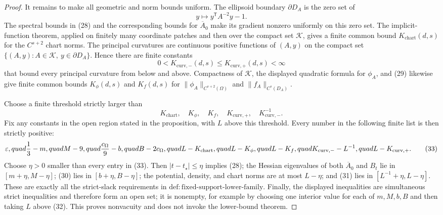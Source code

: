 \documentclass{article}
\begin{document}
\begin{proof}
It remains to make all geometric and norm bounds uniform.  The ellipsoid boundary \(\partial D_A\) is the zero set of
\[
 y\longmapsto y^{\mathsf T}A^{-2}y-1.
\]
The spectral bounds in (28) and the corresponding bounds for \(\overline A_0\) make its gradient nonzero uniformly on this zero set.  The implicit-function theorem, applied on finitely many coordinate patches and then over the compact set \(\mathcal K\), gives a finite common bound \(K_{\mathrm{chart}}(d,s)\) for the \(C^{s+2}\) chart norms.  The principal curvatures are continuous positive functions of \((A,y)\) on the compact set \(\{(A,y):A\in\mathcal K,\ y\in\partial D_A\}\).  Hence there are finite constants
\[
 0<K_{\mathrm{curv},-}(d,s)
 \le K_{\mathrm{curv},+}(d,s)<\infty
 \tag{31}
\]
that bound every principal curvature from below and above.  Compactness of \(\mathcal K\), the displayed quadratic formula for \(\phi_A\), and (29) likewise give finite common bounds \(K_\phi(d,s)\) and \(K_f(d,s)\) for \(\lVert\phi_A\rVert_{C^{s+2}(\Omega)}\) and \(\lVert f_A\rVert_{C^s(D_A)}\).

Choose a finite threshold strictly larger than
\[
 K_{\mathrm{chart}},\quad K_\phi,\quad K_f,
 \quad K_{\mathrm{curv},+},\quad K_{\mathrm{curv},-}^{-1}.
 \tag{32}
\]
Fix any constants in the open region stated in the proposition, with \(L\) above this threshold.  Every number in the following finite list is then strictly positive:
\[
 \varepsilon,\\quad \frac13-m,\\quad M-9,\\quad
 \frac{c_\Omega}{9}-b,\\quad B-2c_\Omega,\\quad
 L-K_{\mathrm{chart}},\\quad L-K_\phi,\\quad L-K_f,\\quad
 K_{\mathrm{curv},-}-L^{-1},\\quad L-K_{\mathrm{curv},+}.
 \tag{33}
\]
Choose \(\eta>0\) smaller than every entry in (33).  Then \(\lvert t-t_\star\rvert\le\eta\) implies (28); the Hessian eigenvalues of both \(\overline A_0\) and \(B_t\) lie in \([m+\eta,M-\eta]\); (30) lies in \([b+\eta,B-\eta]\); the potential, density, and chart norms are at most \(L-\eta\); and (31) lies in \([L^{-1}+\eta,L-\eta]\).  These are exactly all the strict-slack requirements in \(\mathrm{def:fixed\text{-}support\text{-}lower\text{-}family}\).  Finally, the displayed inequalities are simultaneous strict inequalities and therefore form an open set; it is nonempty, for example by choosing one interior value for each of \(m,M,b,B\) and then taking \(L\) above (32).  This proves nonvacuity and does not invoke the lower-bound theorem.
\end{proof}
\end{document}

